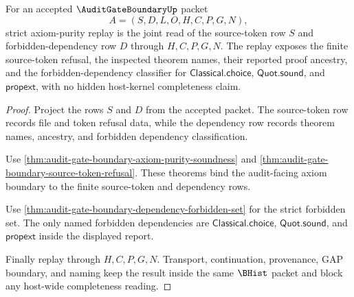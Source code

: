 \begin{theorem}
\label{thm:audit-gate-boundary-strict-axiom-purity-replay}
For an accepted $\AuditGateBoundaryUp$ packet
$$
A=(S,D,L,O,H,C,P,G,N),
$$
strict axiom-purity replay is the joint read of the source-token row $S$ and forbidden-dependency row $D$ through $H,C,P,G,N$. The replay exposes the finite source-token refusal, the inspected theorem names, their reported proof ancestry, and the forbidden-dependency classifier for $\mathsf{Classical.choice}$, $\mathsf{Quot.sound}$, and $\mathsf{propext}$, with no hidden host-kernel completeness claim.
\end{theorem}
\begin{proof}
Project the rows $S$ and $D$ from the accepted packet. The source-token row records file and token refusal data, while the dependency row records theorem names, ancestry, and forbidden dependency classification.

Use \autoref{thm:audit-gate-boundary-axiom-purity-soundness} and \autoref{thm:audit-gate-boundary-source-token-refusal}. These theorems bind the audit-facing axiom boundary to the finite source-token and dependency rows.

Use \autoref{thm:audit-gate-boundary-dependency-forbidden-set} for the strict forbidden set. The only named forbidden dependencies are $\mathsf{Classical.choice}$, $\mathsf{Quot.sound}$, and $\mathsf{propext}$ inside the displayed report.

Finally replay through $H,C,P,G,N$. Transport, continuation, provenance, GAP boundary, and naming keep the result inside the same $\BHist$ packet and block any host-wide completeness reading.
\end{proof}

